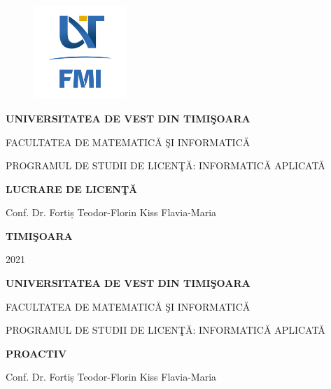 \documentclass[12pt,a4paper]{report}
\begin{document}
\thispagestyle{empty}
\begin{center}
\begin{figure}[h!]
\vspace{-20pt}
\begin{center}
\includegraphics[width=100pt]{FMI-03.png}
\end{center}
\end{figure}


{\large{\bf UNIVERSITATEA DE VEST DIN TIMI\c SOARA

FACULTATEA DE MATEMATIC\u A \c SI INFORMATIC\u A

PROGRAMUL DE STUDII DE LICEN\c T\u A: INFORMATIC\u A APLICAT\u A }}

\vspace{120pt}
{\huge {\bf LUCRARE DE LICEN\c T\u A}}

\vspace{150pt}
\end{center}

{\large{}

\noindent Conf. Dr. Fortiș Teodor-Florin \hfill Kiss Flavia-Maria}

\vfill
\begin{center}
{\bf TIMI\c SOARA

2021}
\end{center}
\newpage
\thispagestyle{empty}
\begin{center}
{\large{\bf UNIVERSITATEA DE VEST DIN TIMI\c SOARA

FACULTATEA DE MATEMATIC\u A \c SI INFORMATIC\u A


PROGRAMUL DE STUDII DE LICEN\c T\u A: INFORMATIC\u A APLICAT\u A }}

\vspace{120pt}
{\huge {\bf PROACTIV}}

\vspace{150pt}
\end{center}

{\large{}

\noindent Conf. Dr. Fortiș Teodor-Florin \hfill Kiss Flavia-Maria}
\end{document}
